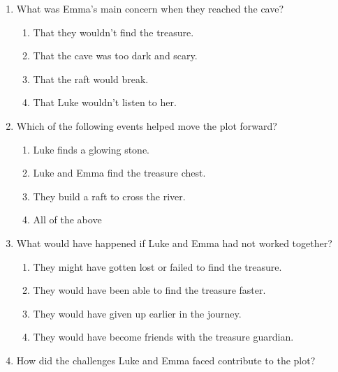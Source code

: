 \documentclass[12pt]{article}
\begin{document}
\begin{enumerate}
\vspace{0.5cm}

\item What was Emma’s main concern when they reached the cave?

\begin{enumerate}[label=\Alph*.]
    \item That they wouldn’t find the treasure.
    \item That the cave was too dark and scary.
    \item That the raft would break.
    \item That Luke wouldn’t listen to her.
\end{enumerate}

\vspace{0.5cm}

\item Which of the following events helped move the plot forward?

\begin{enumerate}[label=\Alph*.]
    \item Luke finds a glowing stone.
    \item Luke and Emma find the treasure chest.
    \item They build a raft to cross the river.
    \item All of the above
\end{enumerate}

\vspace{0.5cm}

\item What would have happened if Luke and Emma had not worked together?

\begin{enumerate}[label=\Alph*.]
    \item They might have gotten lost or failed to find the treasure.
    \item They would have been able to find the treasure faster.
    \item They would have given up earlier in the journey.
    \item They would have become friends with the treasure guardian.
\end{enumerate}

\vspace{0.5cm}

\item How did the challenges Luke and Emma faced contribute to the plot?


\end{enumerate}
\end{document}

